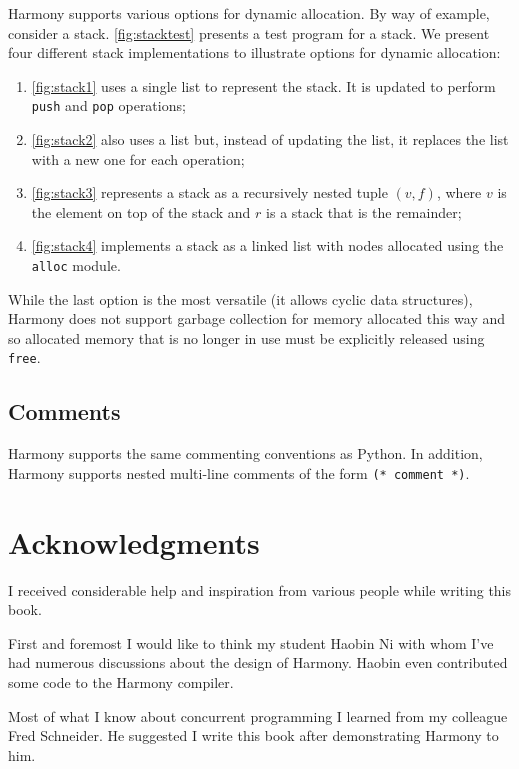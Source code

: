 \documentclass{report}
\begin{document}
Harmony supports various options for dynamic allocation.
By way of example, consider a stack.
\autoref{fig:stacktest} presents a test program for a stack.
We present four different stack implementations to illustrate
options for dynamic allocation:
\begin{enumerate}
\item[] \autoref{fig:stack1} uses a single list to represent the
stack.  It is updated to perform \texttt{push} and \texttt{pop} operations;
\item[] \autoref{fig:stack2} also uses a list but, instead of updating
the list, it replaces the list with a new one for each operation;
\item[] \autoref{fig:stack3} represents a stack as a recursively nested tuple
$(v, f)$, where $v$ is the element on top of the stack and $r$ is a stack
that is the remainder;
\item[] \autoref{fig:stack4} implements a stack as a linked list with nodes
allocated using the \texttt{alloc} module.
\end{enumerate}

While the last option is the most versatile (it allows cyclic
data structures), Harmony does not support garbage collection
for memory allocated this way and so allocated memory that is no
longer in use must be explicitly released using \texttt{free}.

\section{Comments}

Harmony supports the same commenting conventions as Python.
In addition, Harmony supports nested multi-line comments
of the form \texttt{(* comment *)}.

\cleardoublepage
{}
{}
\chapter*{Acknowledgments}

I received considerable help and inspiration from various people
while writing this book.

First and foremost I would like to think my student Haobin Ni with
whom I've had numerous discussions about the design of Harmony.
Haobin even contributed some code to the Harmony compiler.

Most of what I know about concurrent programming I learned from
my colleague Fred Schneider.  He suggested I write this book after
demonstrating Harmony to him.
\end{document}
